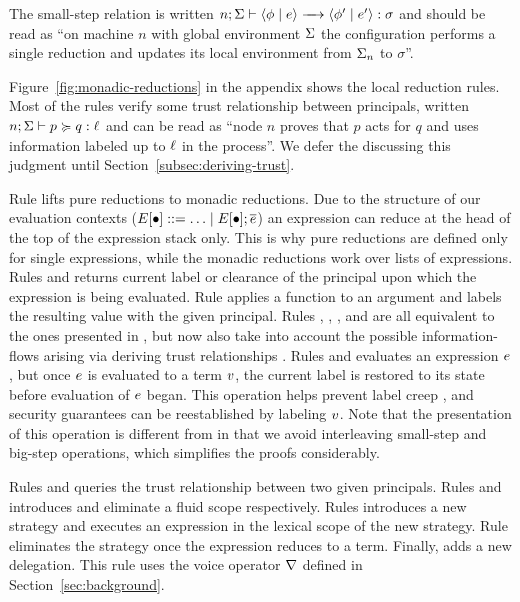The small-step relation is written $\step{n; \env}{\config{\store}{\expr}}{\config{\store'}{\expr'}}{\sigma}$ and should be read as ``on machine $n$ with global environment $\Sigma$ the configuration performs a single reduction and updates its local environment from $\Sigma_n$ to $\sigma$''.

Figure~\ref{fig:monadic-reductions} in the appendix shows the local reduction rules. Most of the rules verify some trust relationship between principals, written $n; \Sigma \vdash p \succcurlyeq q : \ell$ and can be read as ``node $n$ proves that $p$ acts for $q$ and uses information labeled up to $\ell$ in the process''. We defer the discussing this judgment until Section~\ref{subsec:deriving-trust}.

Rule  lifts pure reductions to monadic reductions. Due to the structure of our evaluation contexts ($E \lbrack \bullet \rbrack ::= \ldots \mid E \lbrack \bullet \rbrack ; \overline{e}$) an expression can reduce at the head of the top of the expression stack only. This is why pure reductions are defined only for single expressions, while the monadic reductions work over lists of expressions. Rules  and  returns current label or clearance of the principal upon which the expression is being evaluated. Rule  applies a function to an argument and labels the resulting value with the given principal. Rules , , ,  and  are all equivalent to the ones presented in \cite{SRMMlio}, but now also take into account the possible information-flows arising via deriving trust relationships \cite{Arden:2015:FA:2859845.2859998}. Rules  and  evaluates an expression $e$, but once $e$ is evaluated to a term $v$, the current label is restored to its state before evaluation of $e$ began. This operation helps prevent label creep \cite{Cite label creep}, and security guarantees can be reestablished by labeling $v$. Note that the presentation of this operation is different from \cite{SRMMlio} in that we avoid interleaving small-step and big-step operations, which simplifies the proofs considerably.

Rules  and  queries the trust relationship between two given principals. Rules  and  introduces and eliminate a fluid scope respectively. Rules  introduces a new strategy and executes an expression in the lexical scope of the new strategy. Rule  eliminates the strategy once the expression reduces to a term. Finally,  adds a new delegation. This rule uses the voice operator $\nabla$ defined in Section~\ref{sec:background}.

